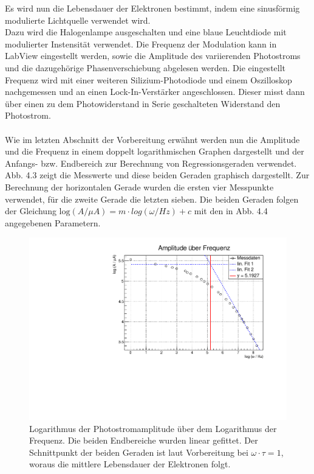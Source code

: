 Es wird nun die Lebensdauer der Elektronen bestimmt, indem eine sinusförmig modulierte Lichtquelle verwendet wird. \\
Dazu wird die Halogenlampe ausgeschalten und eine blaue Leuchtdiode mit modulierter Instensität verwendet. Die Frequenz der Modulation kann in LabView eingestellt werden, sowie die Amplitude des variierenden Photostroms und die dazugehörige Phasenverschiebung abgelesen werden. Die eingestellt Frequenz wird mit einer weiteren Silizium-Photodiode und einem Oszilloskop nachgemessen und an einen Lock-In-Verstärker angeschlossen. Dieser misst dann über einen zu dem Photowiderstand in Serie geschalteten Widerstand den Photostrom. \\
\\
Wie im letzten Abschnitt der Vorbereitung erwähnt werden nun die Amplitude und die Frequenz in einem doppelt logarithmischen Graphen dargestellt und der Anfangs- bzw. Endbereich zur Berechnung von Regressionsgeraden verwendet. \\
Abb. 4.3 zeigt die Messwerte und diese beiden Geraden graphisch dargestellt. Zur Berechnung der horizontalen Gerade wurden die ersten vier Messpunkte verwendet, für die zweite Gerade die letzten sieben. 
Die beiden Geraden folgen der Gleichung $\mathrm{log} (A / \mu A) = m \cdot log(\omega / Hz) + c$ mit den in Abb. 4.4 angegebenen Parametern. \\

\begin{figure}
\label{A4_reg}
\centering
\includegraphics[scale=0.5]{../A4/A4_2fits.pdf}
\caption{Logarithmus der Photostromamplitude über dem Logarithmus der Frequenz. Die beiden Endbereiche wurden linear gefittet. Der Schnittpunkt der beiden Geraden ist laut Vorbereitung bei $\omega \cdot \tau = 1$, woraus die mittlere Lebensdauer der Elektronen folgt.}
\end{figure}


